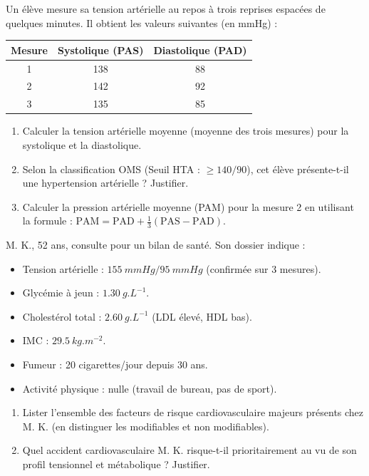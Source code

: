 \documentclass[11pt]{article}
\begin{document}
\begin{exercice}
Un élève mesure sa tension artérielle au repos à trois reprises espacées de quelques minutes. Il obtient les valeurs suivantes (en mmHg) :
\begin{center}
\begin{tabular}{|c|c|c|}
\hline
Mesure & Systolique (PAS) & Diastolique (PAD) \\
\hline
1 & 138 & 88 \\
2 & 142 & 92 \\
3 & 135 & 85 \\
\hline
\end{tabular}
\end{center}
\begin{enumerate}
    \item Calculer la tension artérielle moyenne (moyenne des trois mesures) pour la systolique et la diastolique.
    \item Selon la classification OMS (Seuil HTA : $\ge 140/90$), cet élève présente-t-il une hypertension artérielle ? Justifier.
    \item Calculer la pression artérielle moyenne (PAM) pour la mesure 2 en utilisant la formule : $\text{PAM} = \text{PAD} + \frac{1}{3}(\text{PAS} - \text{PAD})$.
\end{enumerate}
\end{exercice}

\begin{exercice}
M. K., 52 ans, consulte pour un bilan de santé. Son dossier indique :
\begin{itemize}
    \item Tension artérielle : $\SI{155}{mmHg} / \SI{95}{mmHg}$ (confirmée sur 3 mesures).
    \item Glycémie à jeun : $\SI{1.30}{g.L^{-1}}$.
    \item Cholestérol total : $\SI{2.60}{g.L^{-1}}$ (LDL élevé, HDL bas).
    \item IMC : $\SI{29.5}{kg.m^{-2}}$.
    \item Fumeur : 20 cigarettes/jour depuis 30 ans.
    \item Activité physique : nulle (travail de bureau, pas de sport).
\end{itemize}
\begin{enumerate}
    \item Lister l'ensemble des facteurs de risque cardiovasculaire majeurs présents chez M. K. (en distinguer les modifiables et non modifiables).
    \item Quel accident cardiovasculaire M. K. risque-t-il prioritairement au vu de son profil tensionnel et métabolique ? Justifier.
\end{enumerate}
\end{exercice}
\end{document}
